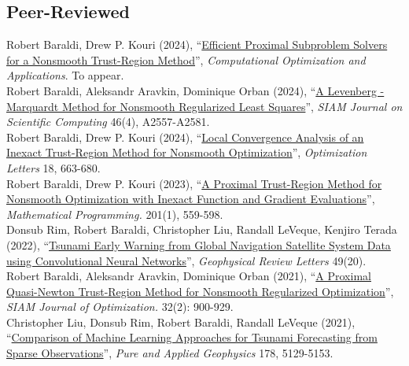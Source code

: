 \documentclass[11pt, a4paper]{article}
\newcommand{\years}[1]{\marginnote{#1}}
\begin{document}
\subsection*{Peer-Reviewed}
\years{2024} Robert Baraldi, Drew P. Kouri (2024), ``\href{https://optimization-online.org/2023/11/efficient-proximal-subproblem-solvers-for-a-nonsmooth-trust-region-method/}{Efficient Proximal Subproblem Solvers for a Nonsmooth Trust-Region Method}'', \emph{Computational Optimization and Applications}. To appear.  \\
\years{2024} Robert Baraldi, Aleksandr Aravkin, Dominique Orban (2024), ``\href{https://doi.org/10.1137/22M1538971}{A Levenberg - Marquardt Method for Nonsmooth Regularized Least Squares}'',  \emph{SIAM Journal on Scientific Computing} 46(4), A2557-A2581.\\
\years{2024} Robert Baraldi, Drew P. Kouri (2024), ``\href{https://link.springer.com/article/10.1007/s11590-023-02092-8}{Local Convergence Analysis of an Inexact Trust-Region Method for Nonsmooth Optimization}'', \emph{Optimization Letters} 18, 663-680.\\
\years{2023} Robert Baraldi, Drew P. Kouri (2023), ``\href{https://link.springer.com/article/10.1007/s10107-022-01915-3}{A Proximal Trust-Region Method for Nonsmooth Optimization with Inexact Function and Gradient Evaluations}'', \emph{Mathematical Programming.} 201(1), 559-598.\\
\years{2022} Donsub Rim, Robert Baraldi, Christopher Liu, Randall LeVeque, Kenjiro Terada (2022), ``\href{https://agupubs.onlinelibrary.wiley.com/doi/full/10.1029/2022GL099511}{Tsunami Early Warning from Global Navigation Satellite System Data using Convolutional Neural Networks}'', \emph{Geophysical Review Letters} 49(20).\\
\noindent
\years{2021} Robert Baraldi, Aleksandr Aravkin, Dominique Orban (2021), ``\href{https://epubs.siam.org/doi/abs/10.1137/21M1409536}{A Proximal Quasi-Newton Trust-Region Method for Nonsmooth Regularized Optimization}'', \emph{SIAM Journal of Optimization.} 32(2): 900-929.\\
\years{2021} Christopher Liu, Donsub Rim, Robert Baraldi, Randall LeVeque (2021), ``\href{https://link.springer.com/article/10.1007/s00024-021-02841-9}{Comparison of Machine Learning Approaches for Tsunami Forecasting from Sparse Observations}'', \emph{Pure and Applied Geophysics} 178, 5129-5153. \\
\noindent
\end{document}
